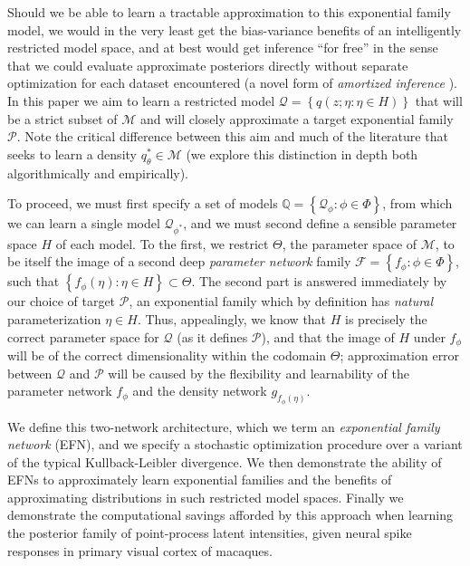 \documentclass[twoside]{article}
\begin{document}
 Should we be able to learn a tractable approximation to this exponential family model, we would in the very least get the bias-variance benefits of an intelligently restricted model space, and at best would get inference ``for free'' in the sense that we could evaluate approximate posteriors directly without separate optimization for each dataset encountered (a novel form of \emph{amortized inference} \cite{gershman2014amortized,Kingma:2013aa,rezende2014stochastic,stuhlmuller2013learning}).  
 In this paper we aim to learn a restricted model $\mathcal{Q} = \left\{ q(z; \eta: \eta \in H)\right\}$ that will be a strict subset of $\mathcal{M}$ and will closely approximate a target exponential family $\mathcal{P}$.  
 Note the critical difference between this aim and much of the literature that seeks to learn a density $q_{\theta}^* \in \mathcal{M}$ (we explore this distinction in depth both algorithmically and empirically).  
 
To proceed, we must first specify a set of models $\mathbb{Q} = \left\{ \mathcal{Q}_\phi : \phi \in \Phi \right\}$, from which we can learn a single model $\mathcal{Q}_{\phi^*}$, and we must second define a sensible parameter space $H$ of each model.  
To the first, we restrict $\Theta$, the parameter space of $\mathcal{M}$, to be itself the image of a second deep \emph{parameter network} family $\mathcal{F} = \left\{f_\phi : \phi \in \Phi\right\}$, such that $\left\{ f_\phi(\eta) : \eta \in H \right\} \subset \Theta$.
The second part is answered immediately by our choice of target $\mathcal{P}$, an exponential family which by definition has \emph{natural} parameterization $\eta \in H$.  
Thus, appealingly, we know that $H$ is precisely the correct parameter space for $\mathcal{Q}$ (as it defines $\mathcal{P}$), and that the image of $H$ under $f_\phi$ will be of the correct dimensionality within the codomain $\Theta$; approximation error between $\mathcal{Q}$ and $\mathcal{P}$ will be caused by the flexibility and learnability of the parameter network $f_\phi$ and the density network $g_{f_{\phi}(\eta)}$.  

We define this two-network architecture, which we term an \emph{exponential family network} (EFN), and we specify a stochastic optimization procedure over a variant of the typical Kullback-Leibler divergence.  We then demonstrate the ability of EFNs to approximately learn exponential families and the benefits of approximating distributions in such restricted model spaces.  Finally we demonstrate the computational savings afforded by this approach when learning the posterior family of point-process latent intensities, given neural spike responses in primary visual cortex of macaques. 
\end{document}
